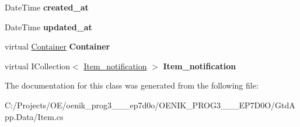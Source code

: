 \begin{DoxyCompactItemize}
\mbox{\label{class_gtd_app_1_1_data_1_1_item_a3682d68c8b565a1c0ec8e0537b5dab32}} 
Date\+Time {\bfseries created\+\_\+at}
\item 
\mbox{\label{class_gtd_app_1_1_data_1_1_item_a17d48c93d6b7ede4c1aafe4b8ff11115}} 
Date\+Time {\bfseries updated\+\_\+at}
\item 
\mbox{\label{class_gtd_app_1_1_data_1_1_item_a2fb658ebeb443dd1329134eea906a3fc}} 
virtual \mbox{\hyperlink{class_gtd_app_1_1_data_1_1_container}{Container}} {\bfseries Container}
\item 
\mbox{\label{class_gtd_app_1_1_data_1_1_item_a554db5e8f7f4f26ed5bdccde64280ec5}} 
virtual I\+Collection$<$ \mbox{\hyperlink{class_gtd_app_1_1_data_1_1_item__notification}{Item\+\_\+notification}} $>$ {\bfseries Item\+\_\+notification}
\end{DoxyCompactItemize}


The documentation for this class was generated from the following file\+:\begin{DoxyCompactItemize}
\item 
C\+:/\+Projects/\+O\+E/oenik\+\_\+prog3\+\_\+\_\+\_\+ep7d0o/\+O\+E\+N\+I\+K\+\_\+\+P\+R\+O\+G3\+\_\+\_\+\_\+\+E\+P7\+D0\+O/\+Gtd\+App.\+Data/Item.\+cs\end{DoxyCompactItemize}
